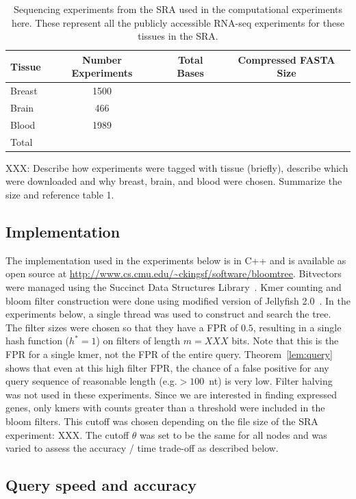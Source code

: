 \documentclass[11pt]{article}
\begin{document}
\begin{table}
\centering
\begin{tabular}{lccc}
\toprule
Tissue & Number Experiments & Total Bases & Compressed FASTA Size \\
\midrule
Breast & 1500 \\
Brain & 466 & \\
Blood & 1989 \\
\midrule
Total & \\
\bottomrule
\end{tabular}
\caption{Sequencing experiments from the SRA used in the computational experiments here. These represent all the publicly accessible RNA-seq experiments for these tissues in the SRA.}
\end{table}

XXX: Describe how experiments were tagged with tissue (briefly), describe which were downloaded and why breast, brain, and blood were chosen. Summarize the size and reference table 1.

\subsection{Implementation}

The implementation used in the experiments below is in C++ and is available as open source at \url{http://www.cs.cmu.edu/~ckingsf/software/bloomtree}. Bitvectors were managed using the Succinct Data Structures Library~\cite{sdsl}. Kmer counting and bloom filter construction were done using modified version of Jellyfish 2.0~\cite{jellyfish}. In the experiments below, a single thread was used to construct and search the tree. The filter sizes were chosen so that they have a FPR of $0.5$, resulting in a single hash function ($h^* = 1$) on filters of length $m=XXX$ bits. Note that this is the FPR for a single kmer, not the FPR of the entire query. Theorem~\ref{lem:query} shows that even at this high filter FPR, the chance of a false positive for any query sequence of reasonable length (e.g.\@ $> 100$~nt) is very low. Filter halving was not used in these experiments. Since we are interested in finding expressed genes, only kmers with counts greater than a threshold were included in the bloom filters. This cutoff was chosen depending on the file size of the SRA experiment: XXX. The cutoff $\theta$ was set to be the same for all nodes and was varied to assess the accuracy / time trade-off as described below. 

\subsection{Query speed and accuracy}
\end{document}
